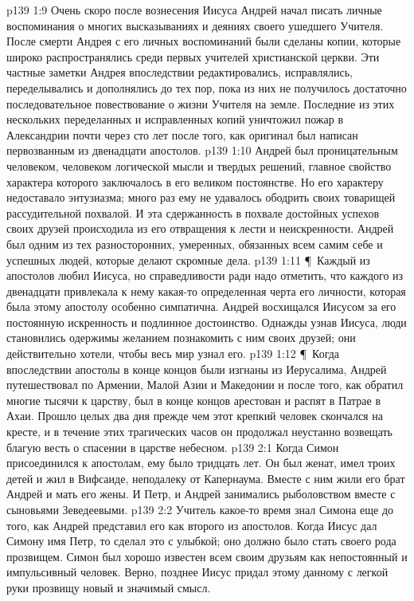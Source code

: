 \vs p139 1:9 Очень скоро после вознесения Иисуса Андрей начал писать личные воспоминания о многих высказываниях и деяниях своего ушедшего Учителя. После смерти Андрея с его личных воспоминаний были сделаны копии, которые широко распространялись среди первых учителей христианской церкви. Эти частные заметки Андрея впоследствии редактировались, исправлялись, переделывались и дополнялись до тех пор, пока из них не получилось достаточно последовательное повествование о жизни Учителя на земле. Последние из этих нескольких переделанных и исправленных копий уничтожил пожар в Александрии почти через сто лет после того, как оригинал был написан первозванным из двенадцати апостолов.
\vs p139 1:10 Андрей был проницательным человеком, человеком логической мысли и твердых решений, главное свойство характера которого заключалось в его великом постоянстве. Но его характеру недоставало энтузиазма; много раз ему не удавалось ободрить своих товарищей рассудительной похвалой. И эта сдержанность в похвале достойных успехов своих друзей происходила из его отвращения к лести и неискренности. Андрей был одним из тех разносторонних, умеренных, обязанных всем самим себе и успешных людей, которые делают скромные дела.
\vs p139 1:11 \P\ Каждый из апостолов любил Иисуса, но справедливости ради надо отметить, что каждого из двенадцати привлекала к нему какая\hyp{}то определенная черта его личности, которая была этому апостолу особенно симпатична. Андрей восхищался Иисусом за его постоянную искренность и подлинное достоинство. Однажды узнав Иисуса, люди становились одержимы желанием познакомить с ним своих друзей; они действительно хотели, чтобы весь мир узнал его.
\vs p139 1:12 \P\ Когда впоследствии апостолы в конце концов были изгнаны из Иерусалима, Андрей путешествовал по Армении, Малой Азии и Македонии и после того, как обратил многие тысячи к царству, был в конце концов арестован и распят в Патрае в Ахаи. Прошло целых два дня прежде чем этот крепкий человек скончался на кресте, и в течение этих трагических часов он продолжал неустанно возвещать благую весть о спасении в царстве небесном.
\vs p139 2:1 Когда Симон присоединился к апостолам, ему было тридцать лет. Он был женат, имел троих детей и жил в Вифсаиде, неподалеку от Капернаума. Вместе с ним жили его брат Андрей и мать его жены. И Петр, и Андрей занимались рыболовством вместе с сыновьями Зеведеевыми.
\vs p139 2:2 Учитель какое\hyp{}то время знал Симона еще до того, как Андрей представил его как второго из апостолов. Когда Иисус дал Симону имя Петр, то сделал это с улыбкой; оно должно было стать своего рода прозвищем. Симон был хорошо известен всем своим друзьям как непостоянный и импульсивный человек. Верно, позднее Иисус придал этому данному с легкой руки прозвищу новый и значимый смысл.
